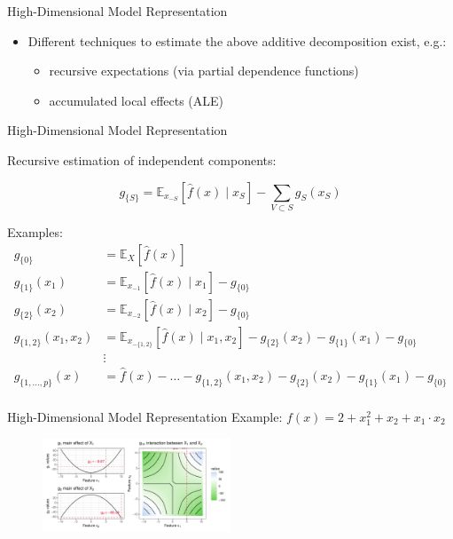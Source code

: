 \documentclass[11pt,compress,t,notes=noshow, aspectratio=169, xcolor=table]{beamer}
\begin{document}
\begin{frame}{High-Dimensional Model Representation }
\begin{itemize}
\item Different techniques to estimate the above additive decomposition exist, e.g.:
		\begin{itemize}
			\item recursive expectations (via partial dependence functions) 
			\item accumulated local effects (ALE)
		\end{itemize}
\end{itemize}
\end{frame}

\begin{frame}{High-Dimensional Model Representation}

Recursive estimation of independent components:

$$g_{\{S\}} = \mathbb{E}_{x_{-S}}\left[\widehat{f}(x) \; \vert  \; x_S \right] - \sum_{V \subset S} g_S(x_S)$$

Examples:
\begin{align*}
 g_{\{0\}} &= \mathbb{E}_X\left[\widehat{f}(x)\right] \\
 g_{\{1\}}(x_1) &= \mathbb{E}_{x_{-1}}\left[\widehat{f}(x) \; \vert  \; x_1 \right] - g_{\{0\}} \\
 g_{\{2\}}(x_2) &= \mathbb{E}_{x_{-2}}\left[\widehat{f}(x) \; \vert  \; x_2 \right] - g_{\{0\}} \\
 g_{\{1, 2\}}(x_1, x_2) &= \mathbb{E}_{x_{-\{1,2\}}}\left[\widehat{f}(x) \; \vert \; x_1, x_2 \right] - g_{\{2\}}(x_2) - g_{\{1\}}(x_1) - g_{\{0\}}\\
 &\vdots \\
 g_{\{1, \dots, p\}}(x) &= \widehat{f}(x) - \dots - g_{\{1, 2\}}(x_1, x_2) %
 - g_{\{2\}}(x_2) - g_{\{1\}}(x_1) - g_{\{0\}}\\
\end{align*}

\end{frame}

\begin{frame}{High-Dimensional Model Representation}
Example:
$f(x) = 2 + x_1^2 + x_2 + x_1 \cdot x_2$
\begin{figure}
\includegraphics[width = 0.5\textwidth]{figure/interaction2}
\end{figure}
\end{frame}
\end{document}
